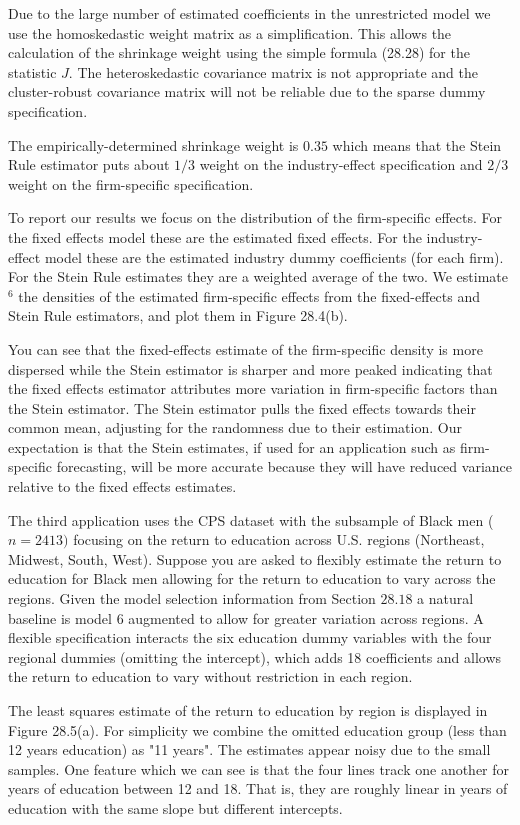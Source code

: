 \documentclass[10pt]{article}
\begin{document}
Due to the large number of estimated coefficients in the unrestricted model we use the homoskedastic weight matrix as a simplification. This allows the calculation of the shrinkage weight using the simple formula (28.28) for the statistic $J$. The heteroskedastic covariance matrix is not appropriate and the cluster-robust covariance matrix will not be reliable due to the sparse dummy specification.

The empirically-determined shrinkage weight is $0.35$ which means that the Stein Rule estimator puts about $1 / 3$ weight on the industry-effect specification and $2 / 3$ weight on the firm-specific specification.

To report our results we focus on the distribution of the firm-specific effects. For the fixed effects model these are the estimated fixed effects. For the industry-effect model these are the estimated industry dummy coefficients (for each firm). For the Stein Rule estimates they are a weighted average of the two. We estimate ${ }^{6}$ the densities of the estimated firm-specific effects from the fixed-effects and Stein Rule estimators, and plot them in Figure 28.4(b).

You can see that the fixed-effects estimate of the firm-specific density is more dispersed while the Stein estimator is sharper and more peaked indicating that the fixed effects estimator attributes more variation in firm-specific factors than the Stein estimator. The Stein estimator pulls the fixed effects towards their common mean, adjusting for the randomness due to their estimation. Our expectation is that the Stein estimates, if used for an application such as firm-specific forecasting, will be more accurate because they will have reduced variance relative to the fixed effects estimates.

The third application uses the CPS dataset with the subsample of Black men ( $n=2413)$ focusing on the return to education across U.S. regions (Northeast, Midwest, South, West). Suppose you are asked to flexibly estimate the return to education for Black men allowing for the return to education to vary across the regions. Given the model selection information from Section $28.18$ a natural baseline is model 6 augmented to allow for greater variation across regions. A flexible specification interacts the six education dummy variables with the four regional dummies (omitting the intercept), which adds 18 coefficients and allows the return to education to vary without restriction in each region.

The least squares estimate of the return to education by region is displayed in Figure 28.5(a). For simplicity we combine the omitted education group (less than 12 years education) as "11 years". The estimates appear noisy due to the small samples. One feature which we can see is that the four lines track one another for years of education between 12 and 18. That is, they are roughly linear in years of education with the same slope but different intercepts.
\end{document}
